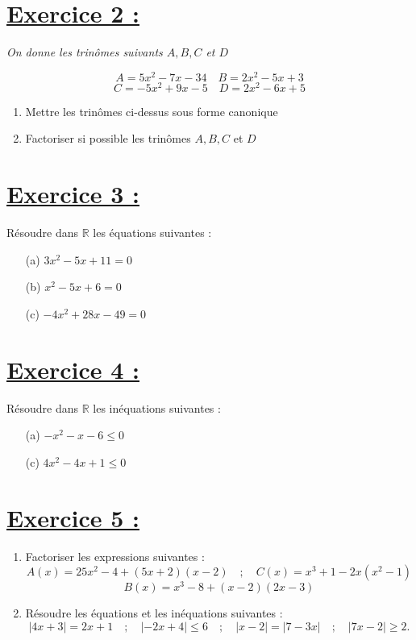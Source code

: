 \documentclass[12pt,a4paper]{article}
\begin{document}
\section*{\underline{Exercice 2 :}}

\textit{On donne les trinômes suivants \( A, B, C \) et \( D \)}

\[
A = 5x^2 - 7x - 34 \quad B = 2x^2 - 5x + 3
\]
\[
C = -5x^2 + 9x - 5 \quad D = 2x^2 - 6x + 5
\]

\begin{enumerate}
    \item Mettre les trinômes ci-dessus sous forme canonique 
    \item Factoriser si possible les trinômes \( A, B, C \) et \( D \) 
\end{enumerate}

\bigskip

\section*{\underline{Exercice 3 :}}

Résoudre dans \( \mathbb{R} \) les équations suivantes :

\begin{enumerate}
    \item[(a)] \( 3x^2 - 5x + 11 = 0 \) 
    \item[(b)] \( x^2 - 5x + 6 = 0 \) 
    \item[(c)] \( -4x^2 + 28x - 49 = 0 \) 
\end{enumerate}

\bigskip

\section*{\underline{Exercice 4 :}}

Résoudre dans \( \mathbb{R} \) les inéquations suivantes :

\begin{enumerate}
    \item[(a)] \( -x^2 - x - 6 \leq 0 \) 
    \item[(c)] \( 4x^2 - 4x + 1 \leq 0 \) 
\end{enumerate}


\section*{\underline{Exercice 5 :}}

\begin{enumerate}
    \item Factoriser les expressions suivantes :
    \[
    A(x) = 25x^2 - 4 + (5x + 2)(x - 2) \quad ; \quad C(x) = x^3 + 1 - 2x(x^2 - 1)
    \]
    \[
    B(x) = x^3 - 8 + (x - 2)(2x - 3)
    \]
    
    \item Résoudre les équations et les inéquations suivantes :
    \[
    |4x + 3| = 2x + 1 \quad ; \quad |-2x + 4| \leq 6 \quad ; \quad |x - 2| = |7 - 3x| \quad ; \quad |7x - 2| \geq 2.
    \]
\end{enumerate}
\end{document}
